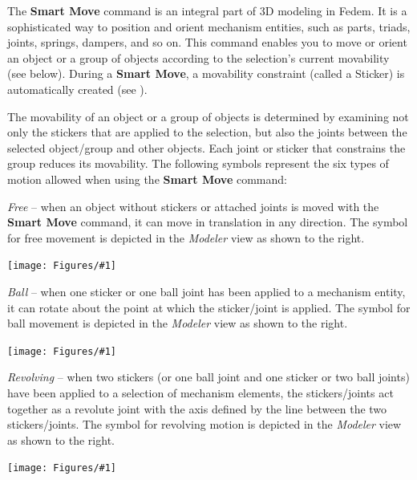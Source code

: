 
The \textbf{Smart Move} command is an integral part of 3D modeling in Fedem.
It is a sophisticated way to position and orient mechanism entities,
such as parts, triads, joints, springs, dampers, and so on.
This command enables you to move or orient an object or a group of objects
according to the selection's current movability (see below).
During a \textbf{Smart Move}, a movability constraint (called a Sticker)
is automatically created (see ).


The movability of an object or a group of objects is determined by examining not
only the stickers that are applied to the selection, but also the joints between
the selected object/group and other objects.
Each joint or sticker that constrains the group reduces its movability.
The following symbols represent the six types of motion allowed when using
the \textbf{Smart Move} command:

\def\RightFigure#1#2{\noindent
  \begin{minipage}{0.65\textwidth}
    \raggedright#2
  \end{minipage}%
  \hfill\begin{minipage}{0.25\textwidth}
    \texttt{[image: Figures/\#1]}
  \end{minipage}}

\RightFigure{SmartMoveFree}{{\sl Free} --
  when an object without stickers or attached joints is moved with
  the \textbf{Smart Move} command, it can move in translation in any direction.
  The symbol for free movement is depicted in the {\sl Modeler} view
  as shown to the right.}

\RightFigure{SmartMoveBall}{{\sl Ball} --
  when one sticker or one ball joint has been applied to a mechanism entity,
  it can rotate about the point at which the sticker/joint is applied.
  The symbol for ball movement is depicted in the {\sl Modeler} view
  as shown to the right.}

\RightFigure{SmartMoveRevolve}{{\sl Revolving} --
  when two stickers (or one ball joint and one sticker or two ball joints)
  have been applied to a selection of mechanism elements, the stickers/joints
  act together as a revolute joint with the axis defined by the line between
  the two stickers/joints.
  The symbol for revolving motion is depicted in the {\sl Modeler} view
  as shown to the right.}

